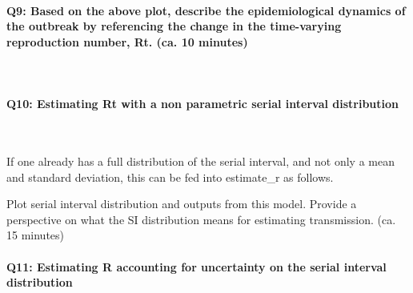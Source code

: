 \documentclass[
  11pt,
]{article}
\newenvironment{Shaded}{\begin{snugshade}}{\end{snugshade}}
\newcommand{\AttributeTok}[1]{\textcolor[rgb]{0.77,0.63,0.00}{#1}}
\newcommand{\FunctionTok}[1]{\textcolor[rgb]{0.00,0.00,0.00}{#1}}
\newcommand{\NormalTok}[1]{#1}
\newcommand{\OtherTok}[1]{\textcolor[rgb]{0.56,0.35,0.01}{#1}}
\newcommand{\SpecialCharTok}[1]{\textcolor[rgb]{0.00,0.00,0.00}{#1}}
\newcommand{\StringTok}[1]{\textcolor[rgb]{0.31,0.60,0.02}{#1}}
\begin{document}
\hypertarget{q9-based-on-the-above-plot-describe-the-epidemiological-dynamics-of-the-outbreak-by-referencing-the-change-in-the-time-varying-reproduction-number-rt.-ca.-10-minutes}{%
\paragraph{Q9: Based on the above plot, describe the epidemiological
dynamics of the outbreak by referencing the change in the time-varying
reproduction number, Rt. (ca. 10
minutes)}\label{q9-based-on-the-above-plot-describe-the-epidemiological-dynamics-of-the-outbreak-by-referencing-the-change-in-the-time-varying-reproduction-number-rt.-ca.-10-minutes}}

~

\hypertarget{q10-estimating-rt-with-a-non-parametric-serial-interval-distribution}{%
\paragraph{Q10: Estimating Rt with a non parametric serial interval
distribution}\label{q10-estimating-rt-with-a-non-parametric-serial-interval-distribution}}

~

If one already has a full distribution of the serial interval, and not
only a mean and standard deviation, this can be fed into estimate\_r as
follows.

Plot serial interval distribution and outputs from this model. Provide a
perspective on what the SI distribution means for estimating
transmission. (ca. 15 minutes)

\begin{Shaded}
\end{Shaded}

\hypertarget{q11-estimating-r-accounting-for-uncertainty-on-the-serial-interval-distribution}{%
\paragraph{Q11: Estimating R accounting for uncertainty on the serial
interval
distribution}\label{q11-estimating-r-accounting-for-uncertainty-on-the-serial-interval-distribution}}
\end{document}
